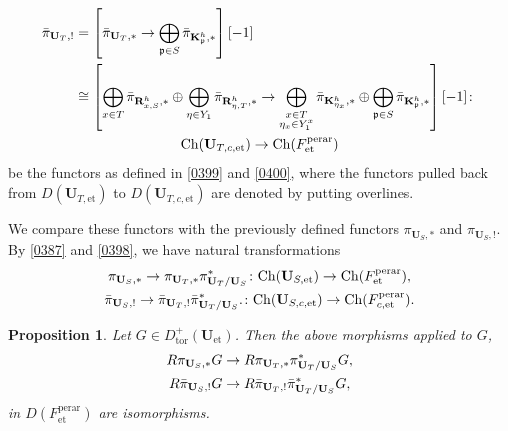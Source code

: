 \documentclass{amsart}
\newtheorem{Prop}[Thm]{Proposition}
\theoremstyle{remark}
\numberwithin{equation}{subsection}
\newcommand{\et}{\mathrm{et}}
\newcommand{\tor}{\mathrm{tor}}
\newcommand{\perar}{\mathrm{perar}}
\newcommand{\alg}[1]{\mathbf{#1}}
\newcommand{\Ch}{\mathrm{Ch}}
\newcommand{\ideal}[1]{\mathfrak{#1}}
\begin{document}
	\begin{gather*}
		\begin{aligned}
					\Bar{\pi}_{\alg{U}_{T}, !}
			&	=
					\left[
							\Bar{\pi}_{\alg{U}_{T}, \ast}
						\to
							\bigoplus_{\ideal{p} \in S}
								\Bar{\pi}_{\alg{K}_{\ideal{p}}^{h}, \ast}
					\right][-1]
			\\
			&	\cong
					\left[
								\bigoplus_{x \in T}
									\Bar{\pi}_{\alg{R}_{x, S}^{h}, \ast}
							\oplus
								\bigoplus_{\eta \in Y_{1}}
									\Bar{\pi}_{\alg{R}_{\eta, T}^{h}, \ast}
						\to
								\bigoplus_{
									\substack{
										x \in T \\
										\eta_{x} \in Y_{1}^{x}
									}
								}
									\Bar{\pi}_{\alg{K}_{\eta_{x}}^{h}, \ast}
							\oplus
								\bigoplus_{\ideal{p} \in S}
									\Bar{\pi}_{\alg{K}_{\ideal{p}}^{h}, \ast}
					\right][-1]
				\colon
		\end{aligned}
		\\
				\Ch(\alg{U}_{T, c, \et})
			\to
				\Ch(F^{\perar}_{\et})
	\end{gather*}
be the functors as defined in \eqref{0399} and \eqref{0400},
where the functors pulled back from $D(\alg{U}_{T, \et})$ to $D(\alg{U}_{T, c, \et})$
are denoted by putting overlines.

We compare these functors with the previously defined functors
$\pi_{\alg{U}_{S}, \ast}$ and $\pi_{\alg{U}_{S}, !}$.
By \eqref{0387} and \eqref{0398}, we have natural transformations
	\begin{gather*}
					\pi_{\alg{U}_{S}, \ast}
				\to
					\pi_{\alg{U}_{T}, \ast} \pi_{\alg{U}_{T} / \alg{U}_{S}}^{\ast}
			\colon
				\Ch(\alg{U}_{S, \et})
			\to
				\Ch(F^{\perar}_{\et}),
		\\
					\Bar{\pi}_{\alg{U}_{S}, !}
				\to
					\Bar{\pi}_{\alg{U}_{T}, !} \Bar{\pi}_{\alg{U}_{T} / \alg{U}_{S}}^{\ast}.
			\colon
				\Ch(\alg{U}_{S, c, \et})
			\to
				\Ch(F^{\perar}_{c, \et}).
	\end{gather*}

\begin{Prop} \label{0411}
	Let $G \in D_{\tor}^{+}(\alg{U}_{\et})$.
	Then the above morphisms applied to $G$,
		\begin{gather} \label{0407}
					R \pi_{\alg{U}_{S}, \ast} G
				\to
					R \pi_{\alg{U}_{T}, \ast} \pi_{\alg{U}_{T} / \alg{U}_{S}}^{\ast} G,
			\\ \label{0408}
					R \Bar{\pi}_{\alg{U}_{S}, !} G
				\to
					R \Bar{\pi}_{\alg{U}_{T}, !} \Bar{\pi}_{\alg{U}_{T} / \alg{U}_{S}}^{\ast} G,
		\end{gather}
	in $D(F^{\perar}_{\et})$ are isomorphisms.
\end{Prop}
\end{document}
